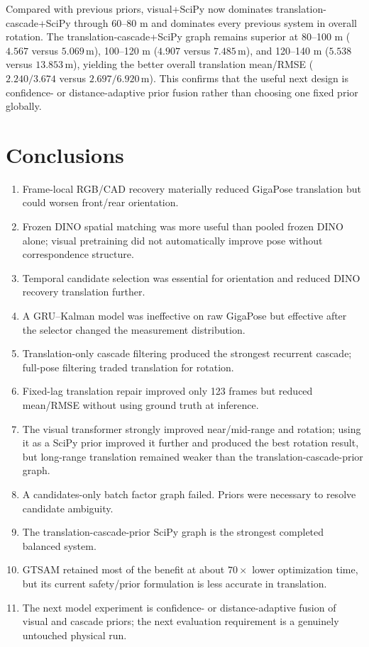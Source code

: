 \documentclass[11pt]{article}
\newcommand{\unitm}{\,\mathrm{m}}
\begin{document}
Compared with previous priors, visual+SciPy now dominates translation-cascade+SciPy through 60--80 m and dominates every previous system in overall rotation.  The translation-cascade+SciPy graph remains superior at 80--100 m ($4.567$ versus $5.069\unitm$), 100--120 m ($4.907$ versus $7.485\unitm$), and 120--140 m ($5.538$ versus $13.853\unitm$), yielding the better overall translation mean/RMSE ($2.240/3.674$ versus $2.697/6.920\unitm$).  This confirms that the useful next design is confidence- or distance-adaptive prior fusion rather than choosing one fixed prior globally.

\section{Conclusions}

\begin{enumerate}
\item Frame-local RGB/CAD recovery materially reduced GigaPose translation but could worsen front/rear orientation.
\item Frozen DINO spatial matching was more useful than pooled frozen DINO alone; visual pretraining did not automatically improve pose without correspondence structure.
\item Temporal candidate selection was essential for orientation and reduced DINO recovery translation further.
\item A GRU--Kalman model was ineffective on raw GigaPose but effective after the selector changed the measurement distribution.
\item Translation-only cascade filtering produced the strongest recurrent cascade; full-pose filtering traded translation for rotation.
\item Fixed-lag translation repair improved only 123 frames but reduced mean/RMSE without using ground truth at inference.
\item The visual transformer strongly improved near/mid-range and rotation; using it as a SciPy prior improved it further and produced the best rotation result, but long-range translation remained weaker than the translation-cascade-prior graph.
\item A candidates-only batch factor graph failed.  Priors were necessary to resolve candidate ambiguity.
\item The translation-cascade-prior SciPy graph is the strongest completed balanced system.
\item GTSAM retained most of the benefit at about $70\times$ lower optimization time, but its current safety/prior formulation is less accurate in translation.
\item The next model experiment is confidence- or distance-adaptive fusion of visual and cascade priors; the next evaluation requirement is a genuinely untouched physical run.
\end{enumerate}
\end{document}
